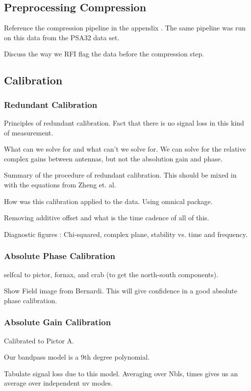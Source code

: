 \documentclass[twocolumn,numberedappendix]{emulateapj}
\begin{document}
\subsection{Preprocessing Compression}
Reference the compression pipeline in the appendix \cite{parsons_et_al2014a}.
The same pipeline was run on this data from the PSA32 data set. 

Discuss the way we RFI flag the data before the compression step.


\subsection{Calibration}
\subsubsection{Redundant Calibration}
    Principles of redundant calibration. Fact that there is no signal loss in
this kind of measurement.

    What can we solve for and what can't we solve for. We can solve for the
relative complex gains between antennas, but not the absolution gain and phase.

    Summary of the procedure of redundant calibration. This should be mixed in
with the equations from Zheng et. al.

    How was this calibration applied to the data. Using omnical package.
    
    Removing additive offset and what is the time cadence of all of this.

    Diagnostic figures : Chi-squared, complex plane, stability vs. time and
frequency. 

\subsubsection{Absolute Phase Calibration}
    selfcal to pictor, fornax, and crab (to get the north-south components).    

    Show Field image from Bernardi. This will give confidence in a good absolute
phase calibration.

\subsubsection{Absolute Gain Calibration}
    Calibrated to Pictor A. 

    Our bandpass model is a 9th degree polynomial. 

    Tabulate signal loss due to this model. Averaging over Nbls, times gives us
an average over independent uv modes.
\end{document}
